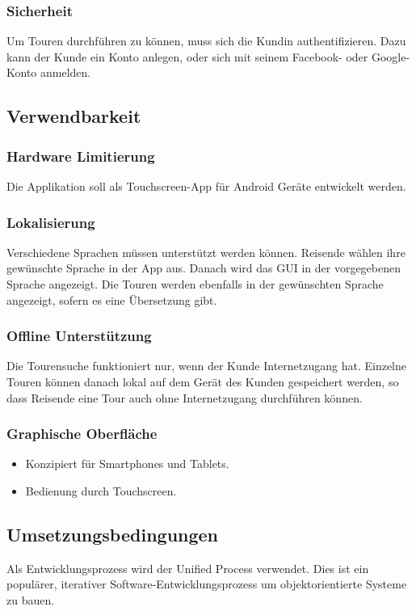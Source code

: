 \documentclass[a4paper,10pt,xetex]{article}
\begin{document}
\subsubsection{Sicherheit}\label{sicherheit}
Um Touren durchführen zu können, muss sich die Kundin authentifizieren.
Dazu kann der Kunde ein Konto anlegen, oder sich mit seinem Facebook-
oder Google-Konto anmelden.


\subsection{Verwendbarkeit}\label{verwendbarkeit}
\subsubsection{Hardware Limitierung}\label{hardware-limitierung}
Die Applikation soll als Touchscreen-App für Android Geräte entwickelt
werden.


\subsubsection{Lokalisierung}\label{lokalisierung}
Verschiedene Sprachen müssen unterstützt werden können. Reisende wählen
ihre gewünschte Sprache in der App aus. Danach wird das GUI in der
vorgegebenen Sprache angezeigt. Die Touren werden ebenfalls in der
gewünschten Sprache angezeigt, sofern es eine Übersetzung gibt.


\subsubsection{Offline Unterstützung}\label{offline-unterstuxfctzung}
Die Tourensuche funktioniert nur, wenn der Kunde Internetzugang hat.
Einzelne Touren können danach lokal auf dem Gerät des Kunden gespeichert
werden, so dass Reisende eine Tour auch ohne Internetzugang durchführen
können.


\subsubsection{Graphische Oberfläche}\label{graphische-oberfluxe4che}
\begin{itemize}
  \item Konzipiert für Smartphones und Tablets.
  \item Bedienung durch Touchscreen.
\end{itemize}


\subsection{Umsetzungsbedingungen}\label{umsetzungsbedingungen}
Als Entwicklungsprozess wird der Unified Process verwendet. Dies ist ein
populärer, iterativer Software-Entwicklungsprozess um objektorientierte
Systeme zu bauen.\cite{UP}
\end{document}
